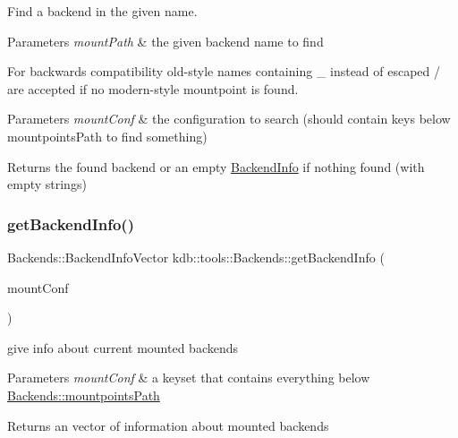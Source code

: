 Find a backend in the given name. 


\begin{DoxyParams}{Parameters}
{\em mount\+Path} & the given backend name to find\\
\hline
\end{DoxyParams}
For backwards compatibility old-\/style names containing \+\_\+ instead of escaped / are accepted if no modern-\/style mountpoint is found.


\begin{DoxyParams}{Parameters}
{\em mount\+Conf} & the configuration to search (should contain keys below mountpoints\+Path to find something)\\
\hline
\end{DoxyParams}
\begin{DoxyReturn}{Returns}
the found backend or an empty \hyperlink{structkdb_1_1tools_1_1BackendInfo}{Backend\+Info} if nothing found (with empty strings) 
\end{DoxyReturn}
\mbox{\label{classkdb_1_1tools_1_1Backends_a82b334d8a1e01df664462c6dd43bd7e1}} 
\subsubsection{\texorpdfstring{get\+Backend\+Info()}{getBackendInfo()}}
{\footnotesize\ttfamily Backends\+::\+Backend\+Info\+Vector kdb\+::tools\+::\+Backends\+::get\+Backend\+Info (\begin{DoxyParamCaption}\item[{\hyperlink{classkdb_1_1KeySet}{Key\+Set}}]{mount\+Conf }\end{DoxyParamCaption})\hspace{0.3cm}{\ttfamily [static]}}



give info about current mounted backends 


\begin{DoxyParams}{Parameters}
{\em mount\+Conf} & a keyset that contains everything below \hyperlink{classkdb_1_1tools_1_1Backends_ac867850accaab4fda286f763cacc3926}{Backends\+::mountpoints\+Path}\\
\hline
\end{DoxyParams}
\begin{DoxyReturn}{Returns}
an vector of information about mounted backends 
\end{DoxyReturn}
\mbox{\label{classkdb_1_1tools_1_1Backends_a76af9122c56426f4d0119e44719c7309}} 
